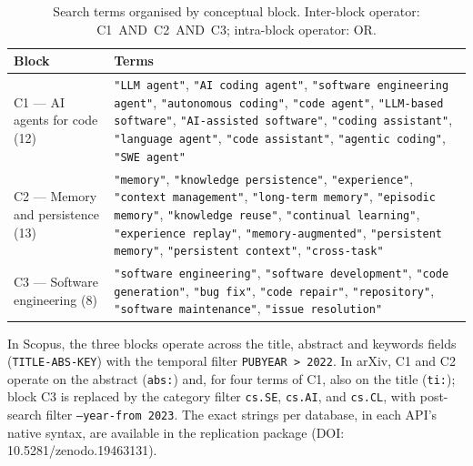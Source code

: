 \begin{table}[htbp]
  \centering
  \caption{Search terms organised by conceptual block.
           Inter-block operator: C1~AND~C2~AND~C3;
           intra-block operator: OR.}
  \label{tab:search-strings}
  \small
  \begin{tabularx}{\textwidth}{@{}
    >{\raggedright\arraybackslash}p{2.8cm}
    X @{}}
    \toprule
    Block & Terms \\
    \midrule
    C1 --- AI agents for code (12)
    & \texttt{"LLM agent"},
      \texttt{"AI coding agent"},
      \texttt{"software engineering agent"},
      \texttt{"autonomous coding"},
      \texttt{"code agent"},
      \texttt{"LLM-based software"},
      \texttt{"AI-assisted software"},
      \texttt{"coding assistant"},
      \texttt{"language agent"},
      \texttt{"code assistant"},
      \texttt{"agentic coding"},
      \texttt{"SWE agent"} \\
    \addlinespace
    C2 --- Memory and persistence (13)
    & \texttt{"memory"},
      \texttt{"knowledge persistence"},
      \texttt{"experience"},
      \texttt{"context management"},
      \texttt{"long-term memory"},
      \texttt{"episodic memory"},
      \texttt{"knowledge reuse"},
      \texttt{"continual learning"},
      \texttt{"experience replay"},
      \texttt{"memory-augmented"},
      \texttt{"persistent memory"},
      \texttt{"persistent context"},
      \texttt{"cross-task"} \\
    \addlinespace
    C3 --- Software engineering (8)
    & \texttt{"software engineering"},
      \texttt{"software development"},
      \texttt{"code generation"},
      \texttt{"bug fix"},
      \texttt{"code repair"},
      \texttt{"repository"},
      \texttt{"software maintenance"},
      \texttt{"issue resolution"} \\
    \bottomrule
  \end{tabularx}
\end{table}

In Scopus, the three blocks operate across the title, abstract and
keywords fields (\texttt{TITLE-ABS-KEY}) with the temporal filter
\texttt{PUBYEAR\,>\,2022}.
In arXiv, C1 and C2 operate on the abstract (\texttt{abs:}) and, for
four terms of C1, also on the title (\texttt{ti:}); block C3 is
replaced by the category filter \texttt{cs.SE}, \texttt{cs.AI}, and
\texttt{cs.CL}, with post-search filter \texttt{--year-from\,2023}.
The exact strings per database, in each API's native syntax, are
available in the replication package
(DOI: 10.5281/zenodo.19463131).

